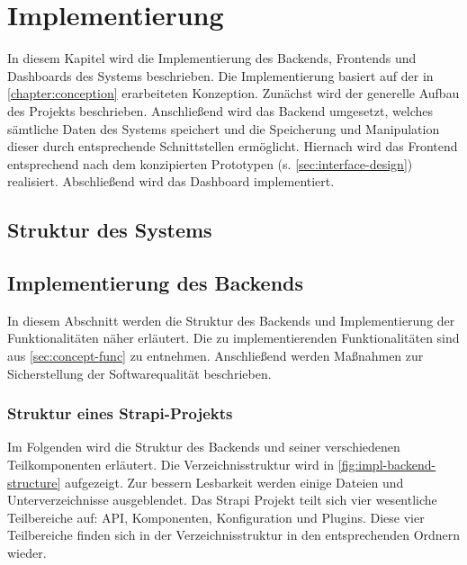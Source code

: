 \chapter{Implementierung}

In diesem Kapitel wird die Implementierung des Backends, Frontends und
Dashboards des Systems beschrieben. Die Implementierung basiert auf der in
\autoref{chapter:conception} erarbeiteten Konzeption. Zunächst wird der
generelle Aufbau des Projekts beschrieben. Anschließend wird das Backend
umgesetzt, welches sämtliche Daten des Systems speichert und die Speicherung und
Manipulation dieser durch entsprechende Schnittstellen ermöglicht. Hiernach wird
das Frontend entsprechend nach dem konzipierten Prototypen (s.
\autoref{sec:interface-design}) realisiert. Abschließend wird das Dashboard
implementiert.

\section{Struktur des Systems}







\section{Implementierung des Backends}

In diesem Abschnitt werden die Struktur des Backends und Implementierung der
Funktionalitäten näher erläutert. Die zu implementierenden Funktionalitäten sind
aus \autoref{sec:concept-func} zu entnehmen. Anschließend werden Maßnahmen zur Sicherstellung der Softwarequalität beschrieben.

\subsection{Struktur eines Strapi-Projekts}

Im Folgenden wird die Struktur des Backends und seiner verschiedenen
Teilkomponenten erläutert. Die Verzeichnisstruktur wird in
\autoref{fig:impl-backend-structure} aufgezeigt. Zur bessern Lesbarkeit werden
einige Dateien und Unterverzeichnisse ausgeblendet. Das Strapi Projekt teilt
sich vier wesentliche Teilbereiche auf: API, Komponenten, Konfiguration und
Plugins. Diese vier Teilbereiche finden sich in der Verzeichnisstruktur in den
entsprechenden Ordnern wieder.

